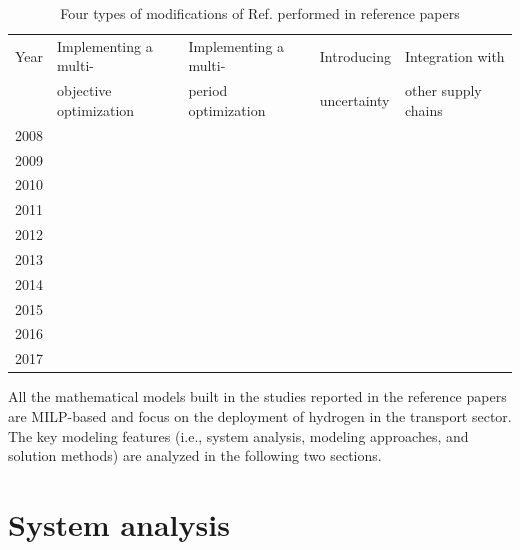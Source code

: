 \documentclass[11pt,3p]{elsarticle}
\begin{document}
\begin{table}[!htbp]
\centering
\caption{Four types of modifications of Ref. \citep{almansoori2006design} performed in reference papers}
\label{tab:Modifications}
\begin{tabular}{ccccc}
\hline
Year & \multicolumn{1}{l}{Implementing a multi-} & \multicolumn{1}{l}{Implementing a multi-} & \multicolumn{1}{l}{Introducing} & \multicolumn{1}{l}{Integration with} \\
 & \multicolumn{1}{l}{objective optimization} & \multicolumn{1}{l}{period optimization} & \multicolumn{1}{l}{uncertainty} & \multicolumn{1}{l}{other supply chains} \\ \hline
2008 & \citep{kim2008strategic} &  &  &  \\
2009 &  &  & \citep{kim2008optimization} &  \\
2010 & \citep{guillen2010bi} & \citep{almansoori2009design} & \citep{sabio2010strategic} &  \\
2011 &  & \citep{konda2011optimal} &  &  \\
2012 & \citep{sabio2012holistic} &  & \citep{almansoori2012design} &  \\
2013 & \citep{han2013multi,almaraz2013assessment} &  &  & \citep{agnolucci2013importance} \\
2014 & \citep{almaraz2014hydrogen} & \citep{almaraz2014hydrogen} & \citep{dayhim2014planning} &  \\
2015 & \citep{almaraz2015deployment} & \citep{almaraz2015deployment} & \citep{nunes2015design} &  \\
2016 &  & \citep{moreno2017towards} &  & \citep{ball2007integration,kim2016optimization,woo2016optimization,cho2016optimization} \\
2017 & \citep{ogumerem2017multi} & \citep{ogumerem2017multi} &  & \citep{won2017design,hwangbo2017mathematical} \\ \hline
\end{tabular}
\end{table}

All the mathematical models built in the studies reported in the reference papers are MILP-based and focus on the deployment of hydrogen in the transport sector. The key modeling features (i.e., system analysis, modeling approaches, and solution methods) are analyzed in the following two sections.

\section{System analysis}
\label{sec:system}
\end{document}
